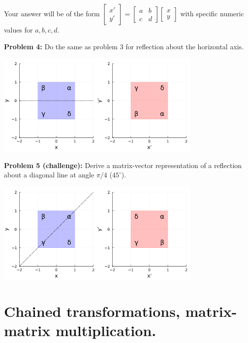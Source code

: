 \documentclass[letter]{article}
\begin{document}
Your answer will be of the form $
  \begin{bmatrix} x' \\ y' \end{bmatrix}
  =
  \begin{bmatrix} a & b \\ c & d \end{bmatrix}                       
  \begin{bmatrix} x \\ y \end{bmatrix}
$
with specific numeric values for $a,b,c,d$.

\newpage

{\bf Problem 4:} Do the same as problem 3 for reflection about the horizontal axis. 

\begin{center}
\includegraphics[width=0.75\textwidth]{yreflection.png}
\end{center}

\newpage

{\bf Problem 5 (challenge):} Derive a matrix-vector representation of a reflection
about a diagonal line at angle $\pi/4$ ($45^\circ$). 

\begin{center}
\includegraphics[width=0.75\textwidth]{diagonal_reflection.png}
\end{center}
\newpage

\section{Chained transformations, matrix-matrix multiplication.}
\end{document}

